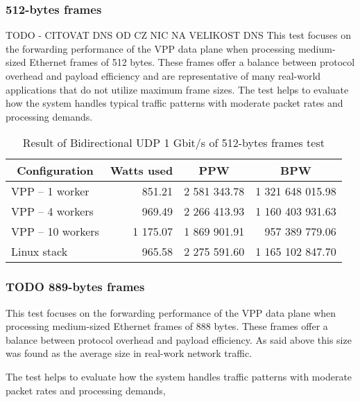 \subsubsection{512-bytes frames}
TODO - CITOVAT DNS OD CZ NIC NA VELIKOST DNS
This test focuses on the forwarding performance of the VPP data plane when processing medium-sized Ethernet frames of 512 bytes. 
These frames offer a balance between protocol overhead and payload efficiency and are representative of many real-world applications that do not utilize maximum frame sizes. 
The test helps to evaluate how the system handles typical traffic patterns with moderate packet rates and processing demands.

\begin{table}[h!]
\centering
\begin{tabular}{|l|r|r|r|}
\hline
\multicolumn{1}{|c|}{\textbf{Configuration}} &
\multicolumn{1}{c|}{\textbf{Watts used}} &
\multicolumn{1}{c|}{\textbf{PPW}} &
\multicolumn{1}{c|}{\textbf{BPW}} \\
\hline
VPP -- 1 worker & 851.21 & 2 581 343.78 & 1 321 648 015.98 \\
VPP -- 4 workers & 969.49 & 2 266 413.93 & 1 160 403 931.63 \\
VPP -- 10 workers & 1 175.07 & 1 869 901.91 & 957 389 779.06 \\
Linux stack & 965.58 & 2 275 591.60 & 1 165 102 847.70 \\
\hline
\end{tabular}
\caption{Result of Bidirectional UDP 1 Gbit/s of 512-bytes frames test}
\label{tab:udp:one}
\end{table}

\subsubsection{TODO 889-bytes frames}

This test focuses on the forwarding performance of the VPP data plane when processing medium-sized Ethernet frames of 888 bytes. 
These frames offer a balance between protocol overhead and payload efficiency. As said above this size was found as the average size in real-work network traffic.

The test helps to evaluate how the system handles traffic patterns with moderate packet rates and processing demands, 

